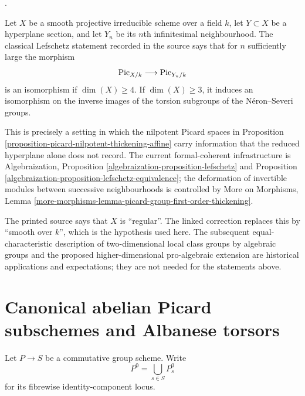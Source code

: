 \begin{remark}
\label{remark-picard-formal-neighbourhoods-lefschetz}
\begin{reference}
\cite[Expos\'e 232, Remark 6.8, pp. 160--161 and correction,
p. 303]{FGA}.
\end{reference}
Let $X$ be a smooth projective irreducible scheme over a field $k$, let
$Y \subset X$ be a hyperplane section, and let $Y_n$ be its $n$th
infinitesimal neighbourhood. The classical Lefschetz statement recorded in
the source says that for $n$ sufficiently large the morphism
\begin{equation}
\label{equation-picard-formal-neighbourhood}
\mathrm{Pic}_{X/k} \longrightarrow \mathrm{Pic}_{Y_n/k}
\end{equation}
is an isomorphism if $\dim(X) \geq 4$. If $\dim(X) \geq 3$, it induces an
isomorphism on the inverse images of the torsion subgroups of the
N\'eron--Severi groups.

This is precisely a setting in which the nilpotent Picard spaces in
Proposition \ref{proposition-picard-nilpotent-thickening-affine} carry
information that the reduced hyperplane alone does not record. The current
formal-coherent infrastructure is Algebraization, Proposition
\ref{algebraization-proposition-lefschetz} and Proposition
\ref{algebraization-proposition-lefschetz-equivalence}; the deformation of
invertible modules between successive neighbourhoods is controlled by More
on Morphisms, Lemma
\ref{more-morphisms-lemma-picard-group-first-order-thickening}.

The printed source says that $X$ is ``regular''. The linked correction
replaces this by ``smooth over $k$'', which is the hypothesis used here.
The subsequent equal-characteristic description of two-dimensional local
class groups by algebraic groups and the proposed higher-dimensional
pro-algebraic extension are historical applications and expectations; they
are not needed for the statements above.
\end{remark}





\section{Canonical abelian Picard subschemes and Albanese torsors}
\label{section-canonical-abelian-picard-albanese}

\noindent
Let $P\to S$ be a commutative group scheme. Write
$$
P^0=\bigcup_{s\in S}P_s^0
$$
for its fibrewise identity-component locus.


